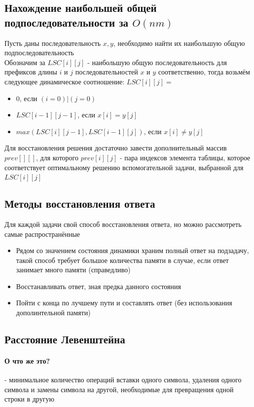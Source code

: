 \documentclass[a4paper,10pt]{article}
\begin{document}
\subsection{Нахождение наибольшей общей подпоследовательности за $O(nm)$}
Пусть даны последовательность $x, y$, необходимо найти их наибольшую общую подпоследовательность \\
Обозначим за $LSC[i][j]$ - наибольшую общую последовательность для префиксов длины $i$ и $j$ последовательностей $x$ и $y$ соответственно, тогда возьмём следующее динамическое соотношение: $LSC[i][j] = $
\begin{itemize}
	\item $0$, если $(i = 0) | (j = 0)$
	\item $LSC[i-1][j-1]$, если $x[i] = y[j]$
	\item $max(LSC[i][j-1], LSC[i-1][j])$, если $x[i] \neq y[j]$
\end{itemize}
Для восстановления решения достаточно завести дополнительный массив $prev[][]$, для которого $prev[i][j]$ - пара индексов элемента таблицы, которое соответствует оптимальному решению вспомогательной задачи, выбранной для $LSC[i][j]$\\
\subsection{Методы восстановления ответа}
Для каждой задачи свой способ восстановления ответа, но можно рассмотреть самые распространённые
\begin{itemize}
	\item Рядом со значением состояния динамики храним полный ответ на подзадачу, такой способ требует большое количества памяти в случае, если ответ занимает много памяти (справедливо)
	\item Восстанавливать ответ, зная предка данного состояния 
	\item Пойти с конца по лучшему пути и составлять ответ (без использования дополинтельной памяти)
\end{itemize}
\subsection{Расстояние Левенштейна}
\paragraph{О что же это?} - минимальное количество операций вставки одного символа, удаления одного символа и замены символа на другой, необходимые для превращения одной строки в другую \\
\end{document}
